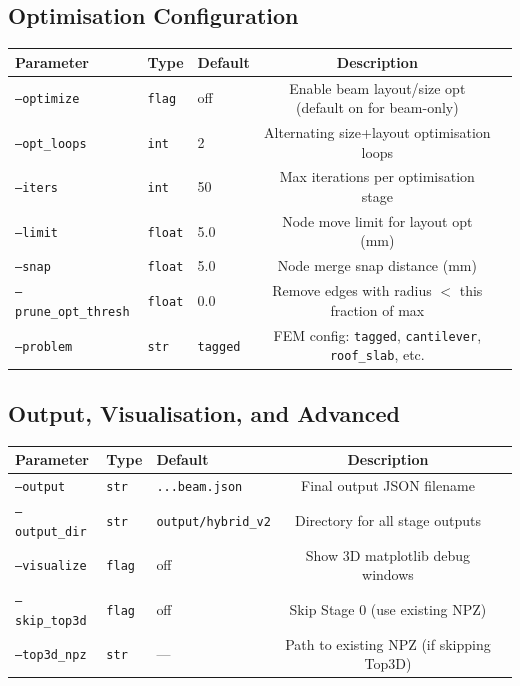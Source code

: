 \documentclass[11pt,a4paper]{article}
\begin{document}
\subsection{Optimisation Configuration}

\begin{table}[h]
\centering
\begin{tabularx}{\textwidth}{lllcX}
\toprule
\textbf{Parameter} & \textbf{Type} & \textbf{Default} & \textbf{Description} \\
\midrule
\texttt{--optimize} & \texttt{flag} & off & Enable beam layout/size opt (default on for beam-only) \\
\texttt{--opt\_loops} & \texttt{int} & 2 & Alternating size+layout optimisation loops \\
\texttt{--iters} & \texttt{int} & 50 & Max iterations per optimisation stage \\
\texttt{--limit} & \texttt{float} & 5.0 & Node move limit for layout opt (mm) \\
\texttt{--snap} & \texttt{float} & 5.0 & Node merge snap distance (mm) \\
\texttt{--prune\_opt\_thresh} & \texttt{float} & 0.0 & Remove edges with radius $<$ this fraction of max \\
\texttt{--problem} & \texttt{str} & \texttt{tagged} & FEM config: \texttt{tagged}, \texttt{cantilever}, \texttt{roof\_slab}, etc. \\
\bottomrule
\end{tabularx}
\end{table}

\subsection{Output, Visualisation, and Advanced}

\begin{table}[h]
\centering
\begin{tabularx}{\textwidth}{lllcX}
\toprule
\textbf{Parameter} & \textbf{Type} & \textbf{Default} & \textbf{Description} \\
\midrule
\texttt{--output} & \texttt{str} & \texttt{...beam.json} & Final output JSON filename \\
\texttt{--output\_dir} & \texttt{str} & \texttt{output/hybrid\_v2} & Directory for all stage outputs \\
\texttt{--visualize} & \texttt{flag} & off & Show 3D matplotlib debug windows \\
\texttt{--skip\_top3d} & \texttt{flag} & off & Skip Stage 0 (use existing NPZ) \\
\texttt{--top3d\_npz} & \texttt{str} & — & Path to existing NPZ (if skipping Top3D) \\
\bottomrule
\end{tabularx}
\end{table}
\end{document}
